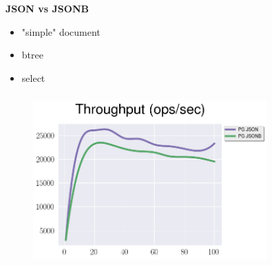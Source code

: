 \documentclass[usenames,dvipsnames, 18pt, compress, aspectratio=169]{beamer}
\begin{document}
\begin{frame}
    \frametitle{}
    \begin{center}
        \textbf{JSON vs JSONB}
        \begin{itemize}[label={}]
            \item "simple" document
            \item btree
            \item select
        \end{itemize}
    \end{center}
\end{frame}

\begin{frame}
    \frametitle{}
    \begin{center}
    \vspace{10pt}
    \begin{figure}
        \includegraphics[width=0.8\textwidth,center]{benchmarks/postgresql_select_json_jsonb.png}
    \end{figure}
    \end{center}
\end{frame}



\end{document}
